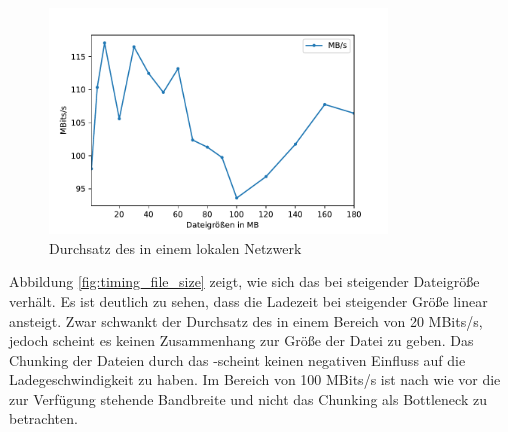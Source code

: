 \begin{figure}[!h]
	\centering
	\includegraphics[width=0.8\textwidth]{figures/durchsatz_file_size}
	\caption[Durchsatz des \pTp \cdns in einem lokalen Netzwerk]{Durchsatz des \pTp \cdns in einem lokalen Netzwerk}
	\label{fig:durchsatz_file_size}
\end{figure}

Abbildung \ref{fig:timing_file_size} zeigt, wie sich das \cdn bei steigender Dateigröße verhält. Es ist deutlich zu sehen, dass die Ladezeit bei steigender Größe linear ansteigt. Zwar schwankt der Durchsatz des \cdns in einem Bereich von 20 MBits/s, jedoch scheint es keinen Zusammenhang zur Größe der Datei zu geben. Das Chunking der Dateien durch das \pTp-\cdn scheint keinen negativen Einfluss auf die Ladegeschwindigkeit zu haben. Im Bereich von 100 MBits/s ist nach wie vor die zur Verfügung stehende Bandbreite und nicht das Chunking als Bottleneck zu betrachten.



